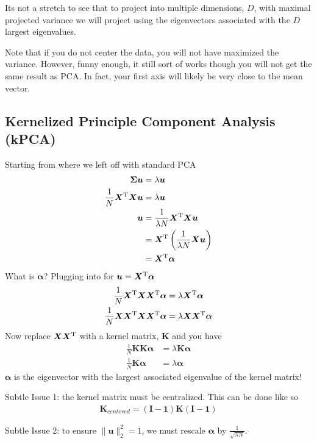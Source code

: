\documentclass[11pt]{article}
\newcommand{\vct}[1]{\boldsymbol{#1}} %
\newcommand{\mat}[1]{\boldsymbol{#1}} %
\newcommand{\T}{^{\textrm T}} %
\begin{document}
Its not a stretch to see that to project into multiple dimensions, $D$, with maximal projected variance we will project using the eigenvectors associated with the $D$ largest eigenvalues. 

Note that if you do not center the data, you will not have maximized the variance. However, funny enough, it still sort of works though you will not get the same result as PCA. In fact, your first axis will likely be very close to the mean vector.

\subsection{Kernelized Principle Component Analysis (kPCA)}

Starting from where we left off with standard PCA
\begin{align*}
\mat{\Sigma}\vct{u} &= \lambda\vct{u}\\
\frac{1}{N} \mat{X}\T\mat{X}\vct{u} &= \lambda\vct{u}\\
\vct{u} &= \frac{1}{\lambda N} \mat{X}\T\mat{X}\vct{u}\\
&= \mat{X}\T\left(\frac{1}{\lambda N} \mat{X}\vct{u}\right)\\
&= \mat{X}\T\vct{\alpha}
\end{align*}
What is $\vct{\alpha}$? Plugging into for $\vct{u} = \mat{X}\T\vct{\alpha}$
\begin{align*}
\frac{1}{N} \mat{X}\T\mat{X}\mat{X}\T\vct{\alpha} &= \lambda\mat{X}\T\vct{\alpha}\\
\frac{1}{N} \mat{X}\mat{X}\T\mat{X}\mat{X}\T\vct{\alpha} &= \lambda\mat{X}\mat{X}\T\vct{\alpha}
\end{align*}
Now replace $\mat{X}\mat{X}\T$ with a kernel matrix, $\mat{K}$ and you have
\begin{align*}
\frac{1}{N} \mat{K}\mat{K}\vct{\alpha} &= \lambda\mat{K}\vct{\alpha}\\
\frac{1}{N} \mat{K}\vct{\alpha} &= \lambda\vct{\alpha}
\end{align*}
$\vct{\alpha}$ is the eigenvector with the largest associated eigenvalue of the kernel matrix!

Subtle Issue 1: the kernel matrix must be centralized. This can be done like so 
\begin{align*}
\mat{K}_{centered} = (\mat{I} - \mat{1})\mat{K}(\mat{I} - \mat{1})
\end{align*}

Subtle Issue 2: to ensure $\|\vct{u}\|_2^2 = 1$, we must rescale $\vct{\alpha}$ by $\frac{1}{\sqrt{\lambda N}}$.
\end{document}
